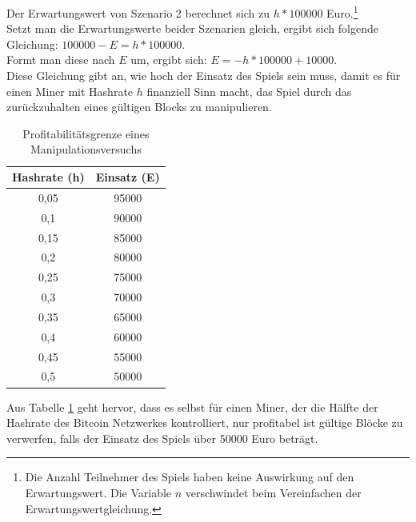 \vspace{0.5cm}
Der Erwartungswert von Szenario 2 berechnet sich zu $ h*100000$ Euro.\footnote{Die Anzahl Teilnehmer des Spiels haben keine Auswirkung auf den Erwartungswert. Die Variable $n$ verschwindet beim Vereinfachen der Erwartungswertgleichung.}\\
Setzt man die Erwartungswerte beider Szenarien gleich, ergibt sich folgende Gleichung: $100000 - E = h*100000$.\\Formt man diese nach $E$ um, ergibt sich: $E=- h*100000 +10000$.\\
Diese Gleichung gibt an, wie hoch der Einsatz des Spiels sein muss, damit es für einen Miner mit Hashrate $h$ finanziell Sinn macht, das Spiel durch das zurückzuhalten eines gültigen Blocks zu manipulieren.

\begin{table}[H]
\centering
\caption{Profitabilitätsgrenze eines Manipulationsversuchs}
\label{tab:btc_mining_attack}
\begin{tabular}{|c|c|}
\hline
Hashrate (h) & Einsatz (E) \\ \hline
0,05                     & 95000       \\ \hline
0,1                      & 90000       \\ \hline
0,15                     & 85000       \\ \hline
0,2                      & 80000       \\ \hline
0,25                     & 75000       \\ \hline
0,3                      & 70000       \\ \hline
0,35                     & 65000       \\ \hline
0,4                      & 60000       \\ \hline
0,45                     & 55000       \\ \hline
0,5                      & 50000       \\ \hline
\end{tabular}
\end{table}

Aus Tabelle \ref{tab:btc_mining_attack} geht hervor, dass es selbst für einen Miner, der die Hälfte der Hashrate des Bitcoin Netzwerkes kontrolliert, nur profitabel ist gültige Blöcke zu verwerfen, falls der Einsatz des Spiels über 50000 Euro beträgt.

